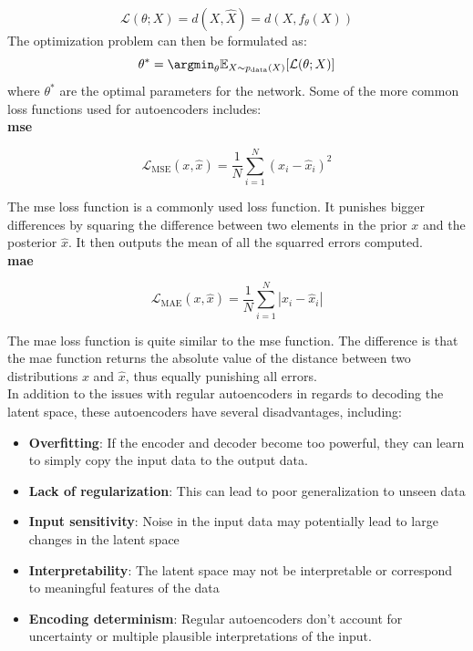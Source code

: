 \begin{equation}
    \mathcal{L}(\theta; X) = d(X, \hat{X}) = d(X, f_\theta(X))
\end{equation}
The optimization problem can then be formulated as:
\begin{equation}
    \theta^* = \argmin_{\theta} \mathbb{E}_{X \sim p_{\text{data}}(X)}[\mathcal{L}(\theta; X)]
\end{equation}
where $\theta^*$ are the optimal parameters for the network. Some of the more common loss functions used for autoencoders includes: \\

\clearpage
\textbf{\acrfull{mse}}

\begin{equation}\label{eq:mse}
    \mathcal{L}_{\text{MSE}}(x, \hat{x}) = \dfrac{1}{N}  \sum_{i=1}^{N}(x_i-\hat{x}_i)^2
\end{equation}

The \acrshort{mse} loss function is a commonly used loss function. It punishes bigger differences by squaring the difference between two elements in the prior $x$ and the posterior $\hat{x}$. It then outputs the mean of all the squarred errors computed. \\

\textbf{\acrfull{mae}}

\begin{equation}\label{eq:mae}
    \mathcal{L}_{\text{MAE}}(x, \hat{x}) = \dfrac{1}{N}  \sum_{i=1}^{N}|x_i-\hat{x}_i|
\end{equation}

The \acrshort{mae} loss function is quite similar to the \acrshort{mse} function. The difference is that the \acrshort{mae} function returns the absolute value of the distance between two distributions $x$ and $\hat{x}$, thus equally punishing all errors. \\

In addition to the issues with regular autoencoders in regards to decoding the latent space, these autoencoders have several disadvantages, including:

\begin{itemize}
    \item \textbf{Overfitting}: If the encoder and decoder become too powerful, they can learn to simply copy the input data to the output data.
    \item \textbf{Lack of regularization}: This can lead to poor generalization to unseen data
    \item \textbf{Input sensitivity}: Noise in the input data may potentially lead to large changes in the latent space
    \item \textbf{Interpretability}: The latent space may not be interpretable or correspond to meaningful features of the data
    \item \textbf{Encoding determinism}: Regular autoencoders don't account for uncertainty or multiple plausible interpretations of the input.
\end{itemize}